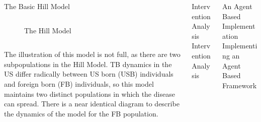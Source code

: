 \documentclass[final]{beamer}
\begin{document}
\begin{frame}
\begin{columns}
\begin{column}{.3\textwidth}
\begin{block}{The Basic Hill Model}
\begin{block}{}
\begin{column}{.39\textwidth}
\begin{figure}[h]
\begin{center}
              \end{center}
              \caption{The Hill Model}
              \label{fig:hillFlow}
            \end{figure}
          \end{column}
          \begin{column}{.39\textwidth}
            The illustration of this model is not full, as there are two
            subpopulations in the Hill Model. TB dynamics in the US differ
            radically between US born (USB) individuals and foreign born (FB)
            individuals,  so this model maintains two distinct populations in
            which the disease can spread. There is a near identical diagram to
            describe the dynamics of the model for the FB population. 
          \end{column}
        \end{block}
      \end{block}
    \end{column}
    \begin{column}{.3\textwidth}
      \begin{block}{Intervention Analysis}
        Intervention Analysis
      \end{block}
    \end{column}
    \begin{column}{.3\textwidth}
      \begin{block}{An Agent Based Implementation}
        Implementing an Agent Based Framework
      \end{block}
    \end{column}
  \end{columns}
\end{frame}
\end{document}
